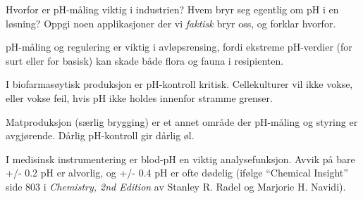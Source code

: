 

Hvorfor er pH-måling viktig i industrien? Hvem bryr seg egentlig om pH i en løsning? Oppgi noen applikasjoner der vi {\it faktisk} bryr oss, og forklar hvorfor.







pH-måling og regulering er viktig i avløpsrensing, fordi ekstreme pH-verdier (for surt eller for basisk) kan skade både flora og fauna i resipienten.

\vskip 10pt

I biofarmasøytisk produksjon er pH-kontroll kritisk. Cellekulturer vil ikke vokse, eller vokse feil, hvis pH ikke holdes innenfor stramme grenser.

\vskip 10pt

Matproduksjon (særlig brygging) er et annet område der pH-måling og styring er avgjørende. Dårlig pH-kontroll gir dårlig øl.







I medisinsk instrumentering er blod-pH en viktig analysefunksjon. Avvik på bare +/- 0.2 pH er alvorlig, og +/- 0.4 pH er ofte dødelig (ifølge ``Chemical Insight'' side 803 i {\it Chemistry, 2nd Edition} av Stanley R. Radel og Marjorie H. Navidi).



